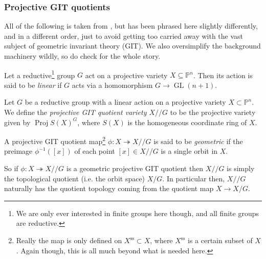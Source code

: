 \documentclass[10pt,notitlepage]{article}
\numberwithin{equation}{subsection}
\DeclareMathOperator{\proj}{Proj}
\DeclareMathOperator{\GL}{GL}
\newcommand{\pee}{\mathbb{P}}
\newcommand{\sslash}{/\!\!/}
\begin{document}
        \subsubsection{Projective GIT quotients} %
        \label{ssub:projective_git_quotients}

            All of the following is taken from \cite{Hoskins:2012uq}, but has been phrased here slightly differently, and in a different order, just to avoid getting too carried away with the vast subject of geometric invariant theory (GIT).
            We also oversimplify the background machinery wildly, so do check \cite[Chapter~4]{Hoskins:2012uq} for the whole story.

            \begin{definition}
                Let a reductive\footnote{We are only ever interested in finite groups here though, and all finite groups are reductive.} group $G$ act on a projective variety $X\subseteq\pee^n$.
                Then its action is said to be \emph{linear} if $G$ acts via a homomorphism $G\to\GL(n+1)$.
            \end{definition}

            \begin{definition}\label{defn:proj-git-quotient}
                Let $G$ be a reductive group with a linear action on a projective variety $X\subset\pee^n$.
                We define the \emph{projective GIT quotient variety $X\sslash G$} to be the projective variety given by $\proj S(X)^G$, where $S(X)$ is the homogeneous coordinate ring of $X$.
            \end{definition}

            \begin{definition}\label{defn:geometric-quotient}
                A projective GIT quotient map\footnote{Really the map is only defined on $X^{\text{ss}}\subset X$, where $X^{\text{ss}}$ is a certain subset of $X$. Again though, this is all much beyond what is needed here.} $\phi\colon X\twoheadrightarrow X\sslash G$ is said to be \emph{geometric} if the preimage $\phi^{-1}([x])$ of each point $[x]\in X\sslash G$ is a single orbit in $X$.
            \end{definition}

            So if $\phi\colon X\twoheadrightarrow X\sslash G$ is a geometric projective GIT quotient then $X\sslash G$ is simply the topological quotient (i.e. the orbit space) $X/G$.
            In particular then, $X\sslash G$ naturally has the quotient topology coming from the quotient map $X\to X/G$.
\end{document}
